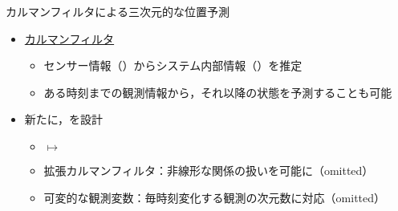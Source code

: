 \begin{frame}[noframenumbering]{カルマンフィルタによる三次元的な位置予測}
    \begin{itemize}
        \item \uline{カルマンフィルタ} \cite{bishop2001introduction}
        \begin{itemize}
            \item センサー情報（）からシステム内部情報（）を推定
            \item ある時刻までの観測情報から，それ以降の状態を予測することも可能
        \end{itemize}
        \item 新たに，を設計
        \begin{itemize}
            \item {} $\mapsto$ 
            \item 拡張カルマンフィルタ：非線形な関係の扱いを可能に（omitted）
            \item 可変的な観測変数：毎時刻変化する観測の次元数に対応（omitted）
        \end{itemize}
    \end{itemize}
\end{frame}

